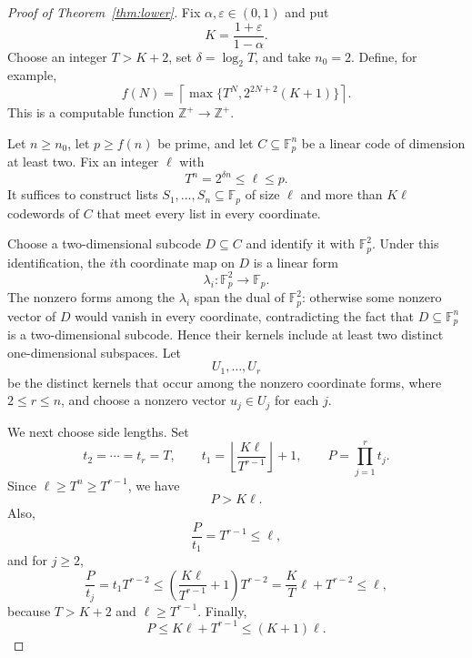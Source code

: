 \documentclass{amsart}
\theoremstyle{definition}
\theoremstyle{remark}
\newcommand{\Fp}{\mathbb{F}_p}
\newcommand{\Zpos}{\mathbb{Z}^{+}}
\begin{document}
\begin{proof}[Proof of Theorem~\ref{thm:lower}]
Fix $\alpha,\varepsilon\in(0,1)$ and put
\[
K=\frac{1+\varepsilon}{1-\alpha}.
\]
Choose an integer $T>K+2$, set $\delta=\log_2 T$, and take $n_0=2$. Define, for example,
\[
f(N)=\left\lceil \max\{T^N,2^{2N+2}(K+1)\}\right\rceil.
\]
This is a computable function $\Zpos\to\Zpos$.

Let $n\ge n_0$, let $p\ge f(n)$ be prime, and let $C\subseteq\Fp^n$ be a linear code of dimension at least two. Fix an integer $\ell$ with
\[
T^n=2^{\delta n}\le \ell\le p.
\]
It suffices to construct lists $S_1,\ldots,S_n\subseteq\Fp$ of size $\ell$ and more than $K\ell$ codewords of $C$ that meet every list in every coordinate.

Choose a two-dimensional subcode $D\subseteq C$ and identify it with $\Fp^2$. Under this identification, the $i$th coordinate map on $D$ is a linear form
\[
\lambda_i:\Fp^2\to\Fp.
\]
The nonzero forms among the $\lambda_i$ span the dual of $\Fp^2$: otherwise some nonzero vector of $D$ would vanish in every coordinate, contradicting the fact that $D\subseteq\Fp^n$ is a two-dimensional subcode. Hence their kernels include at least two distinct one-dimensional subspaces. Let
\[
U_1,\ldots,U_r
\]
be the distinct kernels that occur among the nonzero coordinate forms, where $2\le r\le n$, and choose a nonzero vector $u_j\in U_j$ for each $j$.

We next choose side lengths. Set
\[
t_2=\cdots=t_r=T,
\qquad
t_1=\left\lfloor \frac{K\ell}{T^{r-1}}\right\rfloor+1,
\qquad
P=\prod_{j=1}^r t_j.
\]
Since $\ell\ge T^n\ge T^{r-1}$, we have
\[
P>K\ell.
\]
Also,
\[
\frac{P}{t_1}=T^{r-1}\le \ell,
\]
and for $j\ge2$,
\[
\frac{P}{t_j}=t_1T^{r-2}
\le \left(\frac{K\ell}{T^{r-1}}+1\right)T^{r-2}
=\frac{K}{T}\ell+T^{r-2}
\le \ell,
\]
because $T>K+2$ and $\ell\ge T^{r-1}$. Finally,
\[
P\le K\ell+T^{r-1}\le (K+1)\ell.
\]


\end{proof}
\end{document}
